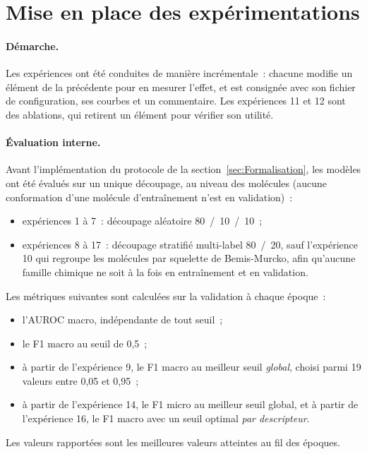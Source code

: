 
\section{Mise en place des expérimentations}
\label{sec:MiseEnPlace}

\paragraph{Démarche.}
Les expériences ont été conduites de manière incrémentale~: chacune modifie un élément de la précédente pour en mesurer l'effet, et est consignée avec son fichier de configuration, ses courbes et un commentaire.
Les expériences 11 et 12 sont des ablations, qui retirent un élément pour vérifier son utilité.

\paragraph{Évaluation interne.}
Avant l'implémentation du protocole de la section~\ref{sec:Formalisation}, les modèles ont été évalués sur un unique découpage, au niveau des molécules (aucune conformation d'une molécule d'entraînement n'est en validation)~:
\begin{itemize}
   \item expériences 1 à 7~: découpage aléatoire 80~/~10~/~10~;
   \item expériences 8 à 17~: découpage stratifié multi-label 80~/~20, sauf l'expérience 10 qui regroupe les molécules par squelette de Bemis-Murcko, afin qu'aucune famille chimique ne soit à la fois en entraînement et en validation.
\end{itemize}
Les métriques suivantes sont calculées sur la validation à chaque époque~:
\begin{itemize}
   \item l'AUROC macro, indépendante de tout seuil~;
   \item le F1 macro au seuil de 0,5~;
   \item à partir de l'expérience 9, le F1 macro au meilleur seuil \emph{global}, choisi parmi 19 valeurs entre 0,05 et 0,95~;
   \item à partir de l'expérience 14, le F1 micro au meilleur seuil global, et à partir de l'expérience 16, le F1 macro avec un seuil optimal \emph{par descripteur}.
\end{itemize}
Les valeurs rapportées sont les meilleures valeurs atteintes au fil des époques.

